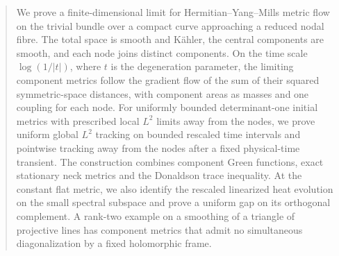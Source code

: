 

\begin{abstract}
We prove a finite-dimensional limit for Hermitian--Yang--Mills metric flow
on the trivial bundle over a compact curve approaching a reduced nodal
fibre. The total space is smooth and K\"ahler, the central components are
smooth, and each node joins distinct components. On the time scale
$\log(1/|t|)$, where $t$ is the degeneration parameter, the limiting
component metrics follow the gradient flow of the sum of their squared
symmetric-space distances, with component areas as masses and one coupling
for each node. For uniformly bounded determinant-one initial metrics with
prescribed local $L^2$ limits away from the nodes, we prove uniform global
$L^2$ tracking on bounded rescaled
time intervals and pointwise tracking away from the nodes after a fixed
physical-time transient. The construction combines component Green
functions, exact stationary neck metrics and the Donaldson trace inequality.
At the constant flat metric, we also identify the rescaled linearized heat
evolution on the small spectral subspace and prove a uniform gap on its
orthogonal complement. A rank-two example on a smoothing of a triangle of
projective lines has component metrics that admit no simultaneous
diagonalization by a fixed holomorphic frame.
\end{abstract}
\maketitle







\clearpage


